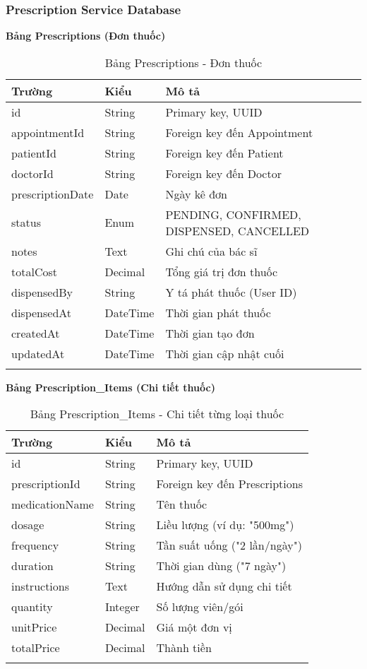 \documentclass[12pt,a4paper]{report}
\begin{document}
\subsubsection{Prescription Service Database}
\textbf{Bảng Prescriptions (Đơn thuốc)}
\begin{longtable}{|p{3cm}|p{2cm}|p{8cm}|}
\hline
\textbf{Trường} & \textbf{Kiểu} & \textbf{Mô tả} \\
\hline
id & String & Primary key, UUID \\
\hline
appointmentId & String & Foreign key đến Appointment \\
\hline
patientId & String & Foreign key đến Patient \\
\hline
doctorId & String & Foreign key đến Doctor \\
\hline
prescriptionDate & Date & Ngày kê đơn \\
\hline
status & Enum & PENDING, CONFIRMED, DISPENSED, CANCELLED \\
\hline
notes & Text & Ghi chú của bác sĩ \\
\hline
totalCost & Decimal & Tổng giá trị đơn thuốc \\
\hline
dispensedBy & String & Y tá phát thuốc (User ID) \\
\hline
dispensedAt & DateTime & Thời gian phát thuốc \\
\hline
createdAt & DateTime & Thời gian tạo đơn \\
\hline
updatedAt & DateTime & Thời gian cập nhật cuối \\
\hline
\caption{Bảng Prescriptions - Đơn thuốc}
\end{longtable}

\textbf{Bảng Prescription\_Items (Chi tiết thuốc)}
\begin{longtable}{|p{3cm}|p{2cm}|p{8cm}|}
\hline
\textbf{Trường} & \textbf{Kiểu} & \textbf{Mô tả} \\
\hline
id & String & Primary key, UUID \\
\hline
prescriptionId & String & Foreign key đến Prescriptions \\
\hline
medicationName & String & Tên thuốc \\
\hline
dosage & String & Liều lượng (ví dụ: "500mg") \\
\hline
frequency & String & Tần suất uống ("2 lần/ngày") \\
\hline
duration & String & Thời gian dùng ("7 ngày") \\
\hline
instructions & Text & Hướng dẫn sử dụng chi tiết \\
\hline
quantity & Integer & Số lượng viên/gói \\
\hline
unitPrice & Decimal & Giá một đơn vị \\
\hline
totalPrice & Decimal & Thành tiền \\
\hline
\caption{Bảng Prescription\_Items - Chi tiết từng loại thuốc}
\end{longtable}
\end{document}

